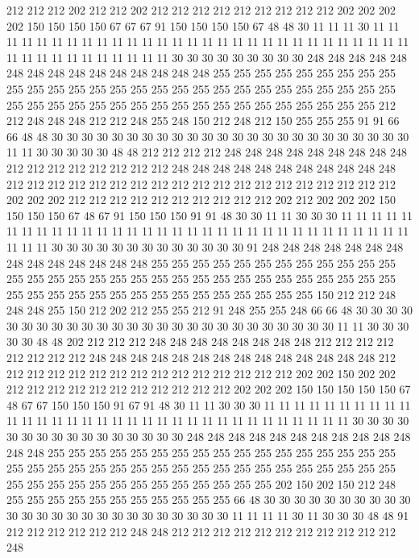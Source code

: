 212 212 212 202 212 212 202 212 212 212 212 212 212 212 212 212 202 202 202 202
150 150 150 150 67 67 67 91 150 150 150 150 67 48 48 30 11 11 11 30
11 11 11 11 11 11 11 11 11 11 11 11 11 11 11 11 11 11 11 11
11 11 11 11 11 11 11 11 11 11 11 11 11 11 11 11 11 11 11 11
30 30 30 30 30 30 30 30 30 248 248 248 248 248 248 248 248 248 248 248
248 248 248 248 255 255 255 255 255 255 255 255 255 255 255 255 255 255 255 255
255 255 255 255 255 255 255 255 255 255 255 255 255 255 255 255 255 255 255 255
255 255 255 255 255 255 255 255 255 255 212 212 248 248 248 212 212 248 255 248
150 212 248 212 150 255 255 255 91 91 66 66 48 48 30 30 30 30 30 30
30 30 30 30 30 30 30 30 30 30 30 30 30 30 30 30 30 30 11 11
30 30 30 30 30 48 48 212 212 212 212 248 248 248 248 248 248 248 248 248
212 212 212 212 212 212 212 212 248 248 248 248 248 248 248 248 248 248 248 212
212 212 212 212 212 212 212 212 212 212 212 212 212 212 212 212 212 212 202 202
202 212 212 212 212 212 212 212 212 212 212 202 212 202 202 202 150 150 150 150
67 48 67 91 150 150 150 91 91 48 30 30 11 11 30 30 30 11 11 11
11 11 11 11 11 11 11 11 11 11 11 11 11 11 11 11 11 11 11 11
11 11 11 11 11 11 11 11 11 11 11 11 30 30 30 30 30 30 30 30
30 30 30 30 30 91 248 248 248 248 248 248 248 248 248 248 248 248 248 248
255 255 255 255 255 255 255 255 255 255 255 255 255 255 255 255 255 255 255 255
255 255 255 255 255 255 255 255 255 255 255 255 255 255 255 255 255 255 255 255
255 255 255 255 255 255 150 212 212 248 248 248 255 150 212 202 212 255 255 212
91 248 255 255 248 66 66 48 30 30 30 30 30 30 30 30 30 30 30 30
30 30 30 30 30 30 30 30 30 30 30 30 30 30 11 11 30 30 30 30
30 48 48 202 212 212 212 248 248 248 248 248 248 248 248 212 212 212 212 212
212 212 212 248 248 248 248 248 248 248 248 248 248 248 248 248 248 212 212 212
212 212 212 212 212 212 212 212 212 212 212 212 202 202 150 202 202 212 212 212
212 212 212 212 212 212 212 212 202 202 202 150 150 150 150 150 67 48 67 67
150 150 150 91 67 91 48 30 11 11 30 30 30 11 11 11 11 11 11 11
11 11 11 11 11 11 11 11 11 11 11 11 11 11 11 11 11 11 11 11
11 11 11 11 11 11 30 30 30 30 30 30 30 30 30 30 30 30 30 30
30 30 248 248 248 248 248 248 248 248 248 248 248 248 248 255 255 255 255 255
255 255 255 255 255 255 255 255 255 255 255 255 255 255 255 255 255 255 255 255
255 255 255 255 255 255 255 255 255 255 255 255 255 255 255 255 255 255 255 255
255 255 255 255 202 150 202 150 212 248 255 255 255 255 255 255 255 255 255 255
255 66 48 30 30 30 30 30 30 30 30 30 30 30 30 30 30 30 30 30
30 30 30 30 30 30 30 30 11 11 11 11 30 11 30 30 30 48 48 91
212 212 212 212 212 212 248 248 212 212 212 212 212 212 212 212 212 212 212 248
